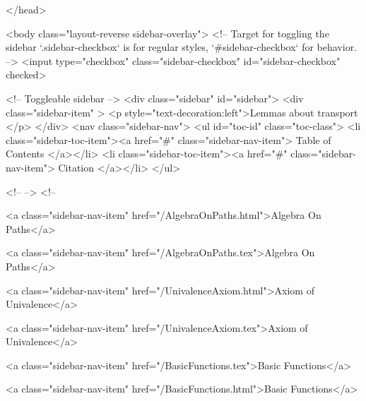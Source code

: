   
</head>




  <body class="layout-reverse sidebar-overlay">
    <!-- Target for toggling the sidebar `.sidebar-checkbox` is for regular
     styles, `#sidebar-checkbox` for behavior. -->
<input type="checkbox" class="sidebar-checkbox" id="sidebar-checkbox" checked>

<!-- Toggleable sidebar -->
<div class="sidebar" id="sidebar">
  <div class="sidebar-item" >
    <p style="text-decoration:left">Lemmas about transport </p>
  </div>
  <nav class="sidebar-nav">
    <ul id="toc-id" class="toc-class">
  <li class="sidebar-toc-item"><a href="#" class="sidebar-nav-item"> Table of Contents </a></li>
  <li class="sidebar-toc-item"><a href="#" class="sidebar-nav-item"> Citation </a></li>
</ul>


    <!--  -->
    <!-- 
      
    
      
    
      
    
      
        
      
    
      
        
          <a class="sidebar-nav-item" href="/AlgebraOnPaths.html">Algebra On Paths</a>
        
      
    
      
        
          <a class="sidebar-nav-item" href="/AlgebraOnPaths.tex">Algebra On Paths</a>
        
      
    
      
        
          <a class="sidebar-nav-item" href="/UnivalenceAxiom.html">Axiom of Univalence</a>
        
      
    
      
        
          <a class="sidebar-nav-item" href="/UnivalenceAxiom.tex">Axiom of Univalence</a>
        
      
    
      
        
          <a class="sidebar-nav-item" href="/BasicFunctions.tex">Basic Functions</a>
        
      
    
      
        
          <a class="sidebar-nav-item" href="/BasicFunctions.html">Basic Functions</a>
        
      
    
